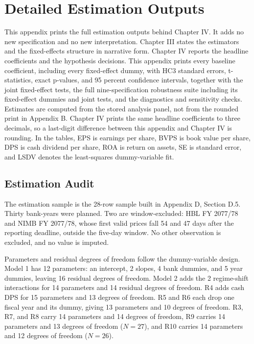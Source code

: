 \chapter{Detailed Estimation Outputs}
\label{app:estimation_outputs}

This appendix prints the full estimation outputs behind Chapter IV. It adds no new specification and no new interpretation. Chapter III states the estimators and the fixed-effects structure in narrative form. Chapter IV reports the headline coefficients and the hypothesis decisions. This appendix prints every baseline coefficient, including every fixed-effect dummy, with HC3 standard errors, t-statistics, exact p-values, and 95 percent confidence intervals, together with the joint fixed-effect tests, the full nine-specification robustness suite including its fixed-effect dummies and joint tests, and the diagnostics and sensitivity checks. Estimates are computed from the stored analysis panel, not from the rounded print in Appendix B. Chapter IV prints the same headline coefficients to three decimals, so a last-digit difference between this appendix and Chapter IV is rounding. In the tables, EPS is earnings per share, BVPS is book value per share, DPS is cash dividend per share, ROA is return on assets, SE is standard error, and LSDV denotes the least-squares dummy-variable fit.

\section{Estimation Audit}

The estimation sample is the 28-row sample built in Appendix D, Section D.5. Thirty bank-years were planned. Two are window-excluded: HBL FY 2077/78 and NIMB FY 2077/78, whose first valid prices fall 54 and 47 days after the reporting deadline, outside the five-day window. No other observation is excluded, and no value is imputed.

Parameters and residual degrees of freedom follow the dummy-variable design. Model 1 has 12 parameters: an intercept, 2 slopes, 4 bank dummies, and 5 year dummies, leaving 16 residual degrees of freedom. Model 2 adds the 2 regime-shift interactions for 14 parameters and 14 residual degrees of freedom. R4 adds cash DPS for 15 parameters and 13 degrees of freedom. R5 and R6 each drop one fiscal year and its dummy, giving 13 parameters and 10 degrees of freedom. R3, R7, and R8 carry 14 parameters and 14 degrees of freedom, R9 carries 14 parameters and 13 degrees of freedom ($N = 27$), and R10 carries 14 parameters and 12 degrees of freedom ($N = 26$).

